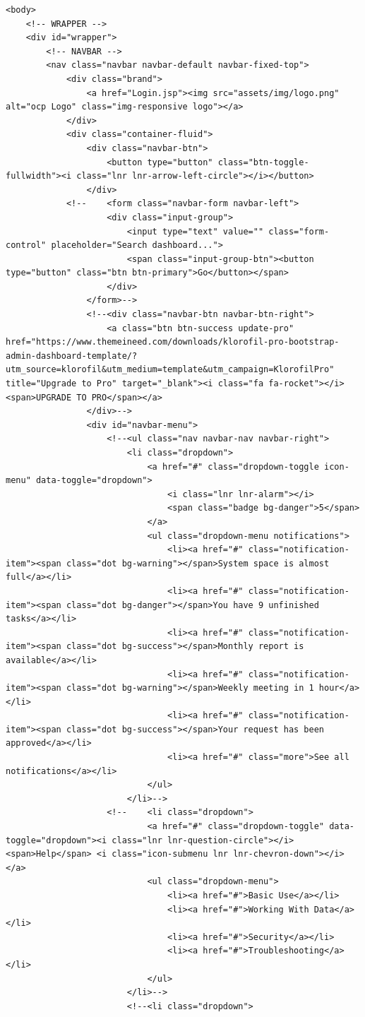 \begin{lstlisting}
<body>
	<!-- WRAPPER -->
	<div id="wrapper">
		<!-- NAVBAR -->
		<nav class="navbar navbar-default navbar-fixed-top">
			<div class="brand">
				<a href="Login.jsp"><img src="assets/img/logo.png" alt="ocp Logo" class="img-responsive logo"></a>
			</div>
			<div class="container-fluid">
				<div class="navbar-btn">
					<button type="button" class="btn-toggle-fullwidth"><i class="lnr lnr-arrow-left-circle"></i></button>
				</div>
			<!--	<form class="navbar-form navbar-left">
					<div class="input-group">
						<input type="text" value="" class="form-control" placeholder="Search dashboard...">
						<span class="input-group-btn"><button type="button" class="btn btn-primary">Go</button></span>
					</div>
				</form>-->
				<!--<div class="navbar-btn navbar-btn-right">
					<a class="btn btn-success update-pro" href="https://www.themeineed.com/downloads/klorofil-pro-bootstrap-admin-dashboard-template/?utm_source=klorofil&utm_medium=template&utm_campaign=KlorofilPro" title="Upgrade to Pro" target="_blank"><i class="fa fa-rocket"></i> <span>UPGRADE TO PRO</span></a>
				</div>-->
				<div id="navbar-menu">
					<!--<ul class="nav navbar-nav navbar-right">
						<li class="dropdown">
							<a href="#" class="dropdown-toggle icon-menu" data-toggle="dropdown">
								<i class="lnr lnr-alarm"></i>
								<span class="badge bg-danger">5</span>
							</a>
							<ul class="dropdown-menu notifications">
								<li><a href="#" class="notification-item"><span class="dot bg-warning"></span>System space is almost full</a></li>
								<li><a href="#" class="notification-item"><span class="dot bg-danger"></span>You have 9 unfinished tasks</a></li>
								<li><a href="#" class="notification-item"><span class="dot bg-success"></span>Monthly report is available</a></li>
								<li><a href="#" class="notification-item"><span class="dot bg-warning"></span>Weekly meeting in 1 hour</a></li>
								<li><a href="#" class="notification-item"><span class="dot bg-success"></span>Your request has been approved</a></li>
								<li><a href="#" class="more">See all notifications</a></li>
							</ul>
						</li>-->
					<!--	<li class="dropdown">
							<a href="#" class="dropdown-toggle" data-toggle="dropdown"><i class="lnr lnr-question-circle"></i> <span>Help</span> <i class="icon-submenu lnr lnr-chevron-down"></i></a>
							<ul class="dropdown-menu">
								<li><a href="#">Basic Use</a></li>
								<li><a href="#">Working With Data</a></li>
								<li><a href="#">Security</a></li>
								<li><a href="#">Troubleshooting</a></li>
							</ul>
						</li>-->
						<!--<li class="dropdown">

\end{lstlisting}
